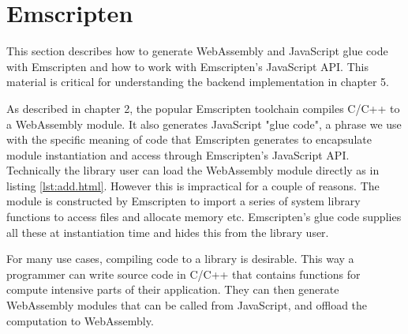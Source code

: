\documentclass[11pt]{book}
\begin{document}



\section{Emscripten}
This section describes how to generate WebAssembly and JavaScript glue code with Emscripten and how to work with Emscripten's JavaScript API. This material is critical for understanding the backend implementation in chapter 5. 

As described in chapter 2, the popular
Emscripten toolchain compiles C/C++ to a WebAssembly module. It also generates JavaScript "glue code", a phrase we use with the specific meaning of code that Emscripten generates to encapsulate module instantiation and access through Emscripten's JavaScript API.
Technically the library user can load the WebAssembly module directly as in listing \ref{lst:add.html}. However this is impractical for a couple of reasons. The module is constructed by Emscripten to import a series of system library functions to access files and allocate memory etc. Emscripten's glue code supplies all these at instantiation time and hides this from the library user.





For many use cases, compiling code to a library is desirable. This way a programmer can write source code in C/C++ that contains functions for compute intensive parts of their application. They can then generate WebAssembly modules that can be called from JavaScript, and offload the computation to WebAssembly. 
\end{document}
